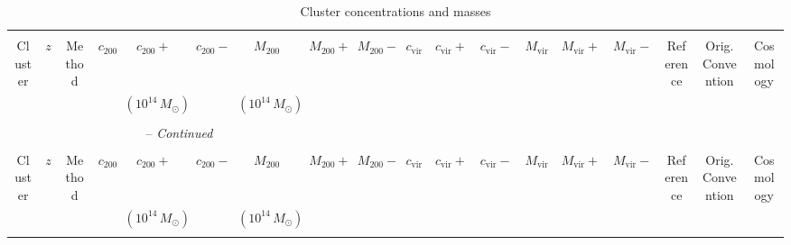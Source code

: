 \documentclass{article}
\begin{document}
\begin{center}
\begin{landscape}
\begin{longtable}{llllllllllllllllll}
\caption{Cluster concentrations and masses} \\
\hline \hline \\[-2ex]
   \multicolumn{1}{c}{Cluster} &
   \multicolumn{1}{c}{$z$} &
   \multicolumn{1}{c}{Method} &
   \multicolumn{1}{c}{$c_{200}$} &
   \multicolumn{1}{c}{$c_{200}+$} &
   \multicolumn{1}{c}{$c_{200}-$} &
   \multicolumn{1}{c}{$M_{200}$} &
   \multicolumn{1}{c}{$M_{200}+$} &
   \multicolumn{1}{c}{$M_{200}-$} &
   \multicolumn{1}{c}{$c_\mathrm{vir}$} &
   \multicolumn{1}{c}{$c_\mathrm{vir}+$} &
   \multicolumn{1}{c}{$c_\mathrm{vir}-$} &
   \multicolumn{1}{c}{$M_\mathrm{vir}$} &
   \multicolumn{1}{c}{$M_\mathrm{vir}+$} &
   \multicolumn{1}{c}{$M_\mathrm{vir}-$} &
   \multicolumn{1}{c}{Reference} &
   \multicolumn{1}{c}{Orig. Convention} &
   \multicolumn{1}{c}{Cosmology} \\ & & & &
\multicolumn{1}{c}{$(10^{14} \, M_\odot)$} & &
\multicolumn{1}{c}{$(10^{14} \, M_\odot)$} & \\ [0.5ex] \hline
   \\[-1.8ex]
\endfirsthead

\multicolumn{8}{c}{{\tablename} \thetable{} -- {\it Continued}} \\[0.5ex]
  \hline \hline \\[-2ex]
   \multicolumn{1}{c}{Cluster} &
   \multicolumn{1}{c}{$z$} &
   \multicolumn{1}{c}{Method} &
   \multicolumn{1}{c}{$c_{200}$} &
   \multicolumn{1}{c}{$c_{200}+$} &
   \multicolumn{1}{c}{$c_{200}-$} &
   \multicolumn{1}{c}{$M_{200}$} &
   \multicolumn{1}{c}{$M_{200}+$} &
   \multicolumn{1}{c}{$M_{200}-$} &
   \multicolumn{1}{c}{$c_\mathrm{vir}$} &
   \multicolumn{1}{c}{$c_\mathrm{vir}+$} &
   \multicolumn{1}{c}{$c_\mathrm{vir}-$} &
   \multicolumn{1}{c}{$M_\mathrm{vir}$} &
   \multicolumn{1}{c}{$M_\mathrm{vir}+$} &
   \multicolumn{1}{c}{$M_\mathrm{vir}-$} &
   \multicolumn{1}{c}{Reference} &
   \multicolumn{1}{c}{Orig. Convention} &
   \multicolumn{1}{c}{Cosmology} \\ & & & &
\multicolumn{1}{c}{$(10^{14} \, M_\odot)$} & &
\multicolumn{1}{c}{$(10^{14} \, M_\odot)$} & \\ [0.5ex] \hline
  \\[-1.8ex]
\endhead



\end{longtable}
\end{landscape}
\end{center}
\end{document}
